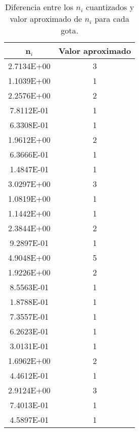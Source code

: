 \documentclass{article}
\begin{document}
\begin{enumerate}
\begin{table}[h!]
    \begin{tabular}{|c|c|}
\hline    
       n$_{i}$ & Valor aproximado\\
       \hline
       2.7134E+00 & 3\\
       \hline
       1.1039E+00 & 1\\
       \hline
       2.2576E+00 & 2\\
       \hline
       7.8112E-01 & 1\\
       \hline
       6.3308E-01 & 1\\
       \hline
       1.9612E+00 & 2\\
       \hline
       6.3666E-01 & 1\\
       \hline
       1.4847E-01 & 1\\
       \hline
       3.0297E+00 & 3\\
       \hline
       1.0819E+00 & 1\\
       \hline
       1.1442E+00 & 1\\
       \hline
       2.3844E+00 & 2\\
       \hline
       9.2897E-01 & 1\\
       \hline
       4.9048E+00 & 5\\
       \hline       
       1.9226E+00 & 2\\
       \hline       
       8.5563E-01 & 1\\
       \hline       
       1.8788E-01 & 1\\
       \hline       
       7.3557E-01 & 1\\
       \hline       
       6.2623E-01 & 1\\
       \hline       
       3.0131E-01 & 1\\
       \hline       
       1.6962E+00 & 2\\
       \hline       
       4.4612E-01 & 1\\
       \hline       
       2.9124E+00 & 3\\
       \hline       
       7.4013E-01 & 1\\
       \hline 
       4.5897E-01 & 1\\
       \hline
  
    \end{tabular}
    \caption{Diferencia entre los $n_{i}$ cuantizados y valor aproximado de $n_{i}$ para cada gota.}
    \label{tab:my_label}
\end{table}



\end{enumerate}
\end{document}
